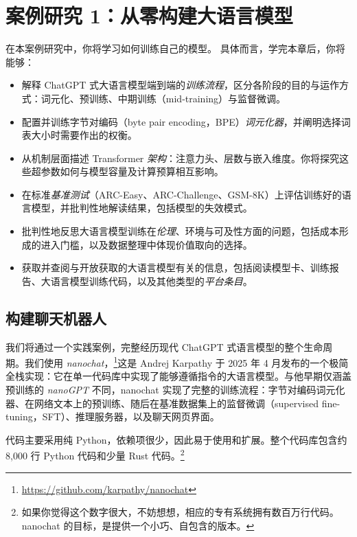 \lstset{
  basicstyle=\ttfamily\footnotesize,
  breaklines=true,
  frame=single,
  numbers=left,
  numberstyle=\tiny,
  xleftmargin=2em,
  framexleftmargin=2em,
}

\chapter{案例研究 1：从零构建大语言模型}
\label{ch:nanochat}

\begin{learningbox}
在本案例研究中，你将学习如何训练自己的模型。
具体而言，学完本章后，你将能够：
\begin{itemize}[leftmargin=*, nosep]
    \item 解释 ChatGPT 式大语言模型端到端的{\em 训练流程}，区分各阶段的目的与运作方式：词元化、预训练、中期训练（mid-training）与监督微调。
    \item 配置并训练字节对编码（byte pair encoding，BPE）{\em 词元化器}，并阐明选择词表大小时需要作出的权衡。
    \item 从机制层面描述 Transformer {\em 架构}：注意力头、层数与嵌入维度。你将探究这些超参数如何与模型容量及计算预算相互影响。
    \item 在标准{\em 基准测试}（ARC-Easy、ARC-Challenge、GSM-8K）上评估训练好的语言模型，并批判性地解读结果，包括模型的失效模式。
    \item 批判性地反思大语言模型训练在{\em 伦理}、环境与可及性方面的问题，包括成本形成的进入门槛，以及数据整理中体现价值取向的选择。
    \item 获取并查阅与开放获取的大语言模型有关的信息，包括阅读模型卡、训练报告、大语言模型训练代码，以及其他类型的{\em 平台条目}。
\end{itemize}
\end{learningbox}

\section{构建聊天机器人}
我们将通过一个实践案例，完整经历现代 ChatGPT 式语言模型的整个生命周期。我们使用 \textit{nanochat}，\footnote{\url{https://github.com/karpathy/nanochat}}这是 Andrej Karpathy 于 2025 年 4 月发布的一个极简全栈实现：它在单一代码库中实现了能够遵循指令的大语言模型。与他早期仅涵盖预训练的 \textit{nanoGPT} 不同，nanochat 实现了完整的训练流程：字节对编码词元化器、在网络文本上的预训练、随后在基准数据集上的监督微调（supervised fine-tuning，SFT）、推理服务器，以及聊天网页界面。

代码主要采用纯 Python，依赖项很少，因此易于使用和扩展。整个代码库包含约 8{,}000 行 Python 代码和少量 Rust 代码。\footnote{如果你觉得这个数字很大，不妨想想，相应的专有系统拥有数百万行代码。nanochat 的目标，是提供一个小巧、自包含的版本。}


